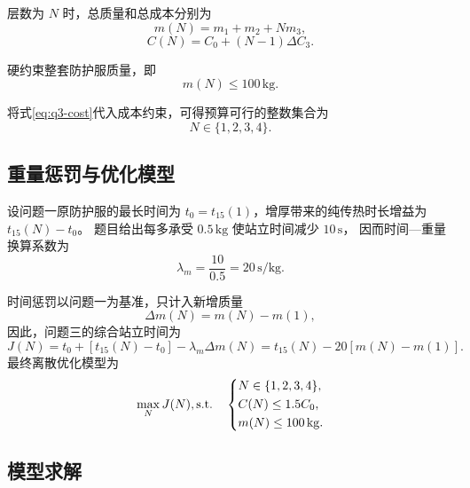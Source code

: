 \documentclass[withoutpreface,bwprint]{cumcmthesis}
\begin{document}
层数为 $N$ 时，总质量和总成本分别为
\begin{equation}
    m(N)=m_1+m_2+Nm_3,
    \label{eq:q3-mass}
\end{equation}
\begin{equation}
    C(N)=C_0+(N-1)\Delta C_3.
    \label{eq:q3-cost}
\end{equation}

硬约束整套防护服质量，即
\begin{equation*}
    m(N)\leq 100\,\mathrm{kg}.
\end{equation*}

将式\eqref{eq:q3-cost}代入成本约束，可得预算可行的整数集合为
\begin{equation*}
    N\in\{1,2,3,4\}.
\end{equation*}

\subsection{重量惩罚与优化模型}

设问题一原防护服的最长时间为
$t_0=t_{15}(1)$，增厚带来的纯传热时长增益为 $t_{15}(N)-t_0$。
题目给出每多承受 $0.5\,\mathrm{kg}$ 使站立时间减少 $10\,\mathrm{s}$，
因而时间—重量换算系数为
\begin{equation*}
    \lambda_m=\frac{10}{0.5}=20\,\mathrm{s/kg}.
\end{equation*}

时间惩罚以问题一为基准，只计入新增质量
\begin{equation*}
    \Delta m(N)=m(N)-m(1),
\end{equation*}
因此，问题三的综合站立时间为
\begin{equation}
    J(N)=t_0+\left[t_{15}(N)-t_0\right]-\lambda_m\Delta m(N)
    =t_{15}(N)-20\left[m(N)-m(1)\right].
    \label{eq:q3-objective}
\end{equation}
最终离散优化模型为
\begin{equation}
    \max_N J(N),\qquad \\
    \mathrm{s.t.}\quad
    \left\{
    \begin{aligned}
        &N\in\{1,2,3,4\},\\
        &C(N)\leq1.5C_0,\\
        &m(N)\leq100\,\mathrm{kg}.
    \end{aligned}
    \right.
    \label{eq:q3-optimization}
\end{equation}

\subsection{模型求解}
\end{document}
